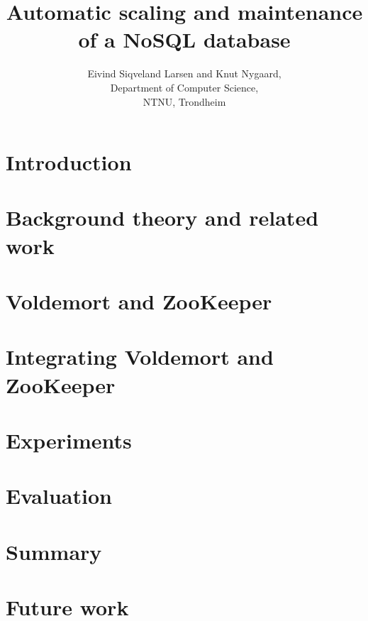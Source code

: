 \documentclass[a4paper, 12pt]{report}
\title{Automatic scaling and maintenance of a NoSQL database}
\author{Eivind Siqveland Larsen and Knut Nygaard,\\
        Department of Computer Science,\\
        NTNU,
        Trondheim}
\begin{document}
\maketitle
\thispagestyle{empty}

\clearpage


\clearpage


\clearpage


\clearpage

\tableofcontents
\clearpage


\listoffigures
\clearpage
\setcounter{page}{1}

\chapter{Introduction}
\label{chapter:introduction}


\clearpage


\clearpage

\chapter{Background theory and related work}
\label{chapter:background}

\clearpage


\clearpage


\clearpage



\chapter{Voldemort and ZooKeeper}
\label{chapter:voldemort_and_zookeeper}

\clearpage


\clearpage

\chapter{Integrating Voldemort and ZooKeeper}
\label{chapter:implementation}

\clearpage

\chapter{Experiments}
\label{chapter:results}



\chapter{Evaluation}
\label{chapter:evaluation}


\chapter{Summary}
\label{chapter:summary}


\chapter{Future work}
\label{chapter:futurework}




\end{document}
